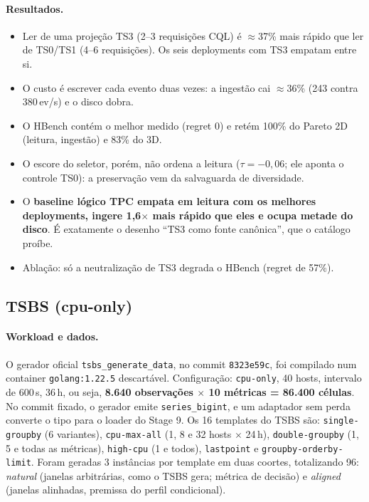 \documentclass[10pt,a4paper,twoside]{article}
\theoremstyle{definition}\newtheorem{definicao}{Definição}
\begin{document}
\paragraph{Resultados.}
\begin{itemize}
\item Ler de uma projeção TS3 (2--3 requisições CQL) é $\approx$37\% mais rápido que ler de TS0/TS1 (4--6 requisições). Os seis deployments com TS3 empatam entre si.
\item O custo é escrever cada evento duas vezes: a ingestão cai $\approx$36\% (243 contra 380\,ev/s) e o disco dobra.
\item O HBench contém o melhor medido (regret 0) e retém 100\% do Pareto 2D (leitura, ingestão) e 83\% do 3D.
\item O escore do seletor, porém, não ordena a leitura ($\tau=-0{,}06$; ele aponta o controle TS0): a preservação vem da salvaguarda de diversidade.
\item O \textbf{baseline lógico TPC empata em leitura com os melhores deployments, ingere 1,6$\times$ mais rápido que eles e ocupa metade do disco}. É exatamente o desenho ``TS3 como fonte canônica'', que o catálogo proíbe.
\item Ablação: só a neutralização de TS3 degrada o HBench (regret de 57\%).
\end{itemize}

\subsection{TSBS (cpu-only)}
\paragraph{Workload e dados.} O gerador oficial \texttt{tsbs\_generate\_data}, no commit \texttt{8323e59c}, foi compilado num container \texttt{golang:1.22.5} descartável. Configuração: \texttt{cpu-only}, 40 hosts, intervalo de 600\,s, 36\,h, ou seja, \textbf{8.640 observações $\times$ 10 métricas = 86.400 células}. No commit fixado, o gerador emite \texttt{series\_bigint}, e um adaptador sem perda converte o tipo para o loader do Stage 9. Os 16 templates do TSBS são: \texttt{single-groupby} (6 variantes), \texttt{cpu-max-all} (1, 8 e 32 hosts $\times$ 24\,h), \texttt{double-groupby} (1, 5 e todas as métricas), \texttt{high-cpu} (1 e todos), \texttt{lastpoint} e \texttt{groupby-orderby-limit}. Foram geradas 3 instâncias por template em duas coortes, totalizando 96: \emph{natural} (janelas arbitrárias, como o TSBS gera; métrica de decisão) e \emph{aligned} (janelas alinhadas, premissa do perfil condicional).
\end{document}
